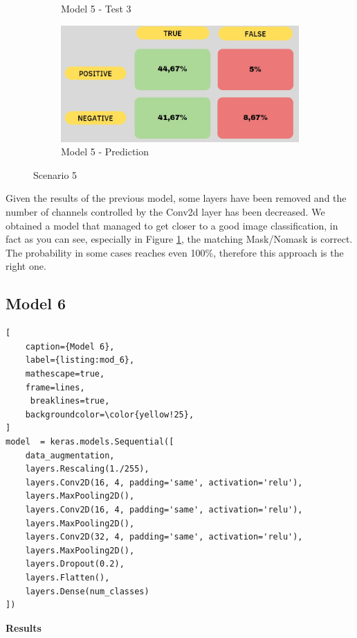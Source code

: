 \documentclass[a4paper,12pt]{article}
\begin{document}
\begin{figure}
\begin{subfigure}{6cm}
        \caption{ Model 5 - Test 3}
        \label{fig:t5_3}
    \end{subfigure}
     \begin{subfigure}{6cm}
        \includegraphics[width=\linewidth]{images_latex/model5.jpg}
        \caption{ Model 5 - Prediction}
    \end{subfigure}
    \caption{Scenario 5}%
\end{figure}

Given the results of the previous model, some layers have been removed and the number of channels controlled by the Conv2d layer has been decreased. 
We obtained a model that managed to get closer to a good image classification, in fact as you can see, especially in Figure \ref{fig:t5_3}, the matching Mask/Nomask is correct.
The probability in some cases reaches even 100\%, therefore this approach is the right one.
\newpage
\subsection{Model 6}

\begin{lstlisting}[
    caption={Model 6},
    label={listing:mod_6},
    mathescape=true, 
    frame=lines,
     breaklines=true,
    backgroundcolor=\color{yellow!25},
]
model  = keras.models.Sequential([
    data_augmentation,
    layers.Rescaling(1./255),
    layers.Conv2D(16, 4, padding='same', activation='relu'),
    layers.MaxPooling2D(),
    layers.Conv2D(16, 4, padding='same', activation='relu'),
    layers.MaxPooling2D(),
    layers.Conv2D(32, 4, padding='same', activation='relu'),
    layers.MaxPooling2D(),
    layers.Dropout(0.2),
    layers.Flatten(),
    layers.Dense(num_classes)
])
\end{lstlisting}

\textbf{Results}
\end{document}
